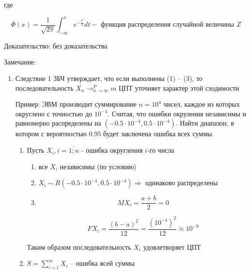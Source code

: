 где

\begin{equation*}
    \Phi(x) = \frac{1}{\sqrt{2\pi}} \int_{-\infty}^{x} e^{-\frac{t^2}{2}} dt - \text{ функция распределения случайной величины } Z
\end{equation*}

Доказательство: без доказательства

Замечание:

\begin{enumerate}
    \item Следствие 1 ЗБЧ утверждает, что если выполнены (1) -- (3), то последовательность $\overline{X_n} \to_{n\to\infty}^P m$ ЦПТ уточняет характер этой сходимости

        Пример: ЭВМ производит суммирование $n=10^4$ чисел, каждое из которых округлено с точностью до $10^{-4}$. Считая, что ошибки окруления независимы и равномерно распределены на $(-0.5 \cdot 10^{-4}, 0.5 \cdot 10^{-4})$. Найти диапазон, в котором с вероятностью $0.95$ будет заключена ошибка всех суммы.

        \begin{enumerate}
            \item Пусть $X_i, i = \overline{1;n}$ - ошибка округления $i$-го числа

                \begin{enumerate}
                    \item все $X_i$ независимы (по условию)
                    \item $X_i \sim R(-0.5 \cdot 10^{-4}, 0.5 \cdot 10^{-4}) \Rightarrow$ одинаково распределены
                    \item
                        \begin{equation*}
                            MX_i = \frac{a+b}{2} = 0
                        \end{equation*}

                        \begin{equation*}
                            FX_i = \frac{(b-a)^2}{12} = \frac{(10^{-4})^{2}}{12} \approx 10^{-9}
                        \end{equation*}
                \end{enumerate}

                Таким образом последовательность $X_i$ удовлетворяет ЦПТ

            \item $S = \sum_{i=1}^m X_i$ -- ошибка всей суммы


\end{enumerate}
\end{enumerate}
